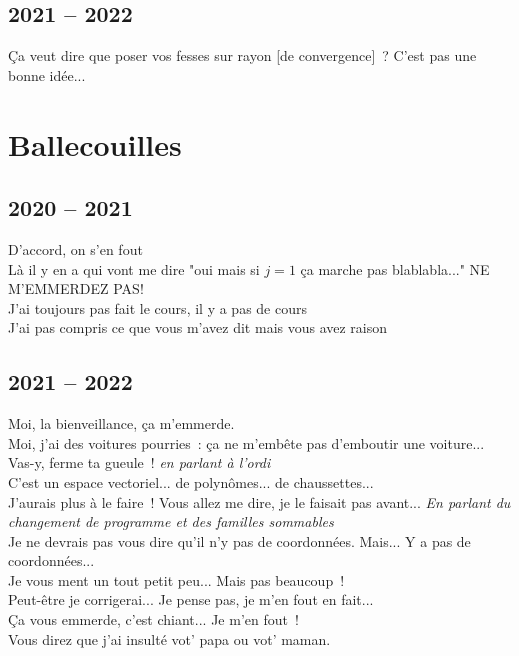 \documentclass[french, a4paper, openany]{book}
\begin{document}
	\subsection*{2021 -- 2022}
	\noindent \og Ça veut dire que poser vos fesses sur rayon [de convergence]~? C'est pas une bonne idée... \fg \\
 
\section*{Ballecouilles}

	\subsection*{2020 -- 2021}
 
	\noindent \og D'accord, on s'en fout \fg \\
	\og Là il y en a qui vont me dire "oui mais si $j = 1$ ça marche pas blablabla..." NE M'EMMERDEZ PAS! \fg \\
	\og J'ai toujours pas fait le cours, il y a pas de cours \fg \\
	\og J'ai pas compris ce que vous m'avez dit mais vous avez raison \fg \\

	\subsection*{2021 -- 2022}

	\noindent \og Moi, la bienveillance, ça m'emmerde. \fg \\
	\og Moi, j'ai des voitures pourries~: ça ne m'embête pas d'emboutir une voiture... \fg \\
	\og Vas-y, ferme ta gueule~! \fg \emph{en parlant à l'ordi} \\
	\og C'est un espace vectoriel... de polynômes... de chaussettes... \fg \\
	\og J'aurais plus à le faire~! Vous allez me dire, je le faisait pas avant... \fg \emph{En parlant du changement de programme et des familles sommables} \\
	\og Je ne devrais pas vous dire qu'il n'y pas de coordonnées. Mais... Y a pas de coordonnées... \fg \\
	\og Je vous ment un tout petit peu... Mais pas beaucoup~! \fg \\
	\og Peut-être je corrigerai... Je pense pas, je m'en fout en fait... \fg \\
	\og Ça vous emmerde, c'est chiant... Je m'en fout~! \fg \\
	\og Vous direz que j'ai insulté vot' papa ou vot' maman. \fg \\
\end{document}
